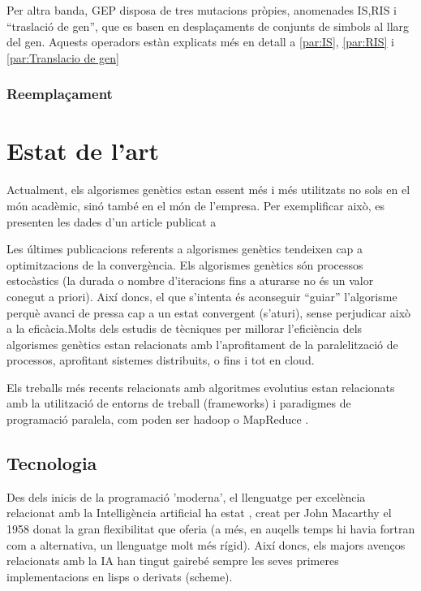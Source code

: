 Per altra banda, GEP disposa de tres mutacions pròpies, anomenades IS,RIS i
``traslació de gen'', que es basen en desplaçaments de conjunts de simbols al
llarg del gen.  Aquests operadors estàn explicats més en detall a \ref{par:IS},
\ref{par:RIS} i \ref{par:Translacio de gen}

\subsubsection{Reemplaçament} %
\label{ssub:Reemplacament}


\section{Estat de l'art} %
\label{sec:Estat de l'art}

Actualment, els algorismes genètics estan essent més i més utilitzats no sols en
el món acadèmic, sinó també en el món de l'empresa.  Per exemplificar això, es
presenten les dades d'un article publicat a 

Les últimes publicacions referents a algorismes genètics tendeixen cap a
optimitzacions de la convergència.  Els algorismes genètics són processos
estocàstics (la durada o nombre d'iteracions fins a aturarse no és un valor
conegut a priori).  Així doncs, el que s'intenta és aconseguir ``guiar''
l'algorisme perquè avanci de pressa cap a un estat convergent (s'aturi), sense
perjudicar això a la eficàcia.Molts dels estudis de tècniques per millorar
l'eficiència dels algorismes genètics estan relacionats amb l'aprofitament de la
paralelització de processos, aprofitant sistemes distribuits, o fins i tot en
cloud.  

Els treballs més recents relacionats amb algoritmes evolutius estan relacionats
amb la utilització de entorns de treball (frameworks) i paradigmes de
programació paralela, com poden ser hadoop o MapReduce \cite{VLCG09}.

\subsection{Tecnologia} %
\label{sub:Tecnologia}

Des dels inicis de la programació 'moderna', el llenguatge per excelència
relacionat amb la Intelligència artificial ha estat \cite{JMC59}, creat per John
Macarthy el 1958 donat la gran flexibilitat que oferia (a més, en auqells temps
hi havia fortran com a alternativa, un llenguatge molt més rígid).  Així doncs,
els majors avenços relacionats amb la IA han tingut gairebé sempre les seves
primeres implementacions en lisps o derivats (scheme).  

